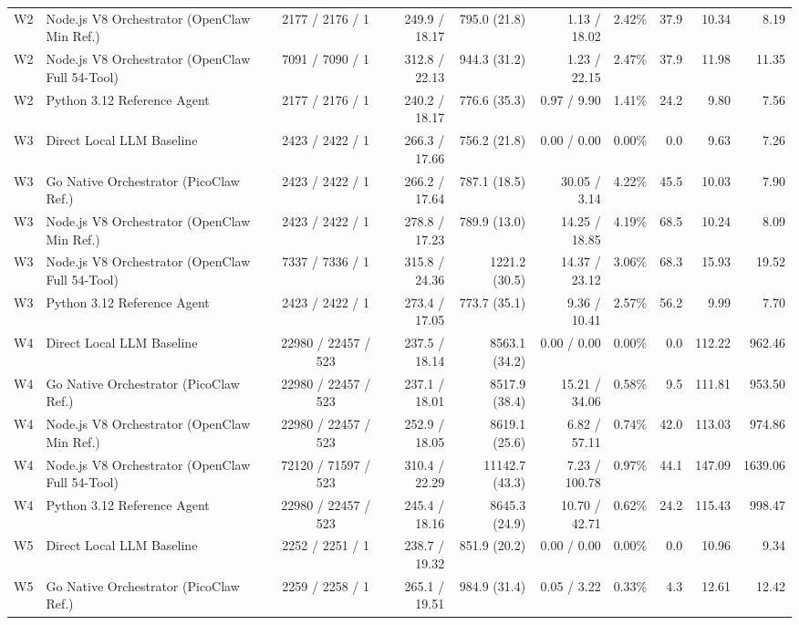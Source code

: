 \begin{table}[t]
\begin{tabular}{l l c r r r r r r r}
W2 & Node.js V8 Orchestrator (OpenClaw Min Ref.) & 2177 / 2176 / 1 & 249.9 / 18.17 & 795.0 (21.8) & 1.13 / 18.02 & 2.42\% & 37.9 & 10.34 & 8.19 \\
W2 & Node.js V8 Orchestrator (OpenClaw Full 54-Tool) & 7091 / 7090 / 1 & 312.8 / 22.13 & 944.3 (31.2) & 1.23 / 22.15 & 2.47\% & 37.9 & 11.98 & 11.35 \\
W2 & Python 3.12 Reference Agent & 2177 / 2176 / 1 & 240.2 / 18.17 & 776.6 (35.3) & 0.97 / 9.90 & 1.41\% & 24.2 & 9.80 & 7.56 \\
\hline
W3 & Direct Local LLM Baseline & 2423 / 2422 / 1 & 266.3 / 17.66 & 756.2 (21.8) & 0.00 / 0.00 & 0.00\% & 0.0 & 9.63 & 7.26 \\
W3 & Go Native Orchestrator (PicoClaw Ref.) & 2423 / 2422 / 1 & 266.2 / 17.64 & 787.1 (18.5) & 30.05 / 3.14 & 4.22\% & 45.5 & 10.03 & 7.90 \\
W3 & Node.js V8 Orchestrator (OpenClaw Min Ref.) & 2423 / 2422 / 1 & 278.8 / 17.23 & 789.9 (13.0) & 14.25 / 18.85 & 4.19\% & 68.5 & 10.24 & 8.09 \\
W3 & Node.js V8 Orchestrator (OpenClaw Full 54-Tool) & 7337 / 7336 / 1 & 315.8 / 24.36 & 1221.2 (30.5) & 14.37 / 23.12 & 3.06\% & 68.3 & 15.93 & 19.52 \\
W3 & Python 3.12 Reference Agent & 2423 / 2422 / 1 & 273.4 / 17.05 & 773.7 (35.1) & 9.36 / 10.41 & 2.57\% & 56.2 & 9.99 & 7.70 \\
\hline
W4 & Direct Local LLM Baseline & 22980 / 22457 / 523 & 237.5 / 18.14 & 8563.1 (34.2) & 0.00 / 0.00 & 0.00\% & 0.0 & 112.22 & 962.46 \\
W4 & Go Native Orchestrator (PicoClaw Ref.) & 22980 / 22457 / 523 & 237.1 / 18.01 & 8517.9 (38.4) & 15.21 / 34.06 & 0.58\% & 9.5 & 111.81 & 953.50 \\
W4 & Node.js V8 Orchestrator (OpenClaw Min Ref.) & 22980 / 22457 / 523 & 252.9 / 18.05 & 8619.1 (25.6) & 6.82 / 57.11 & 0.74\% & 42.0 & 113.03 & 974.86 \\
W4 & Node.js V8 Orchestrator (OpenClaw Full 54-Tool) & 72120 / 71597 / 523 & 310.4 / 22.29 & 11142.7 (43.3) & 7.23 / 100.78 & 0.97\% & 44.1 & 147.09 & 1639.06 \\
W4 & Python 3.12 Reference Agent & 22980 / 22457 / 523 & 245.4 / 18.16 & 8645.3 (24.9) & 10.70 / 42.71 & 0.62\% & 24.2 & 115.43 & 998.47 \\
\hline
W5 & Direct Local LLM Baseline & 2252 / 2251 / 1 & 238.7 / 19.32 & 851.9 (20.2) & 0.00 / 0.00 & 0.00\% & 0.0 & 10.96 & 9.34 \\
W5 & Go Native Orchestrator (PicoClaw Ref.) & 2259 / 2258 / 1 & 265.1 / 19.51 & 984.9 (31.4) & 0.05 / 3.22 & 0.33\% & 4.3 & 12.61 & 12.42 \\

\end{tabular}
\end{table}
